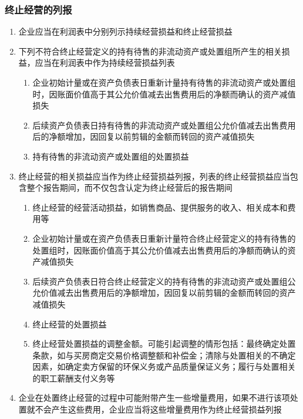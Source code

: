 \documentclass[UTF8,12pt]{ctexart}
\numberwithin{equation}{section} %
\numberwithin{figure}{section}
\numberwithin{table}{section}
\begin{document}
	\subsubsection{终止经营的列报}
	\begin{enumerate}
		\item 企业应当在利润表中分别列示持续经营损益和终止经营损益
		
		\item 下列不符合终止经营定义的持有待售的非流动资产或处置组所产生的相关损益，应当在利润表中作为持续经营损益列表
		\begin{enumerate}
			\item 企业初始计量或在资产负债表日重新计量持有待售的非流动资产或处置组时，因账面价值高于其公允价值减去出售费用后的净额而确认的资产减值损失
			
			\item 后续资产负债表日持有待售的非流动资产或处置组公允价值减去出售费用后的净额增加，因回复以前剪辑的金额而转回的资产减值损失
			
			\item 持有待售的非流动资产或处置组的处置损益
		\end{enumerate}
		
		\item 终止经营的相关损益应当作为终止经营损益列报，列表的终止经营损益应当包含整个报告期间，而不仅包含认定为终止经营后的报告期间
		\begin{enumerate}
			\item 终止经营的经营活动损益，如销售商品、提供服务的收入、相关成本和费用等
			
			\item 企业初始计量或在资产负债表日重新计量符合终止经营定义的持有待售的处置组时，因账面价值高于其公允价值减去出售费用后的净额而确认的资产减值损失
			
			\item 后续资产负债表日符合终止经营定义的持有待售的非流动资产或处置组公允价值减去出售费用后的净额增加，因回复以前剪辑的金额而转回的资产减值损失
			
			\item 终止经营的处置损益
			
			\item 终止经营处置损益的调整金额。可能引起调整的情形包括：最终确定处置条款，如与买房商定交易价格调整额和补偿金；清除与处置相关的不确定因素，如确定卖方保留的环保义务或产品质量保证义务；履行与处置相关的职工薪酬支付义务等
		\end{enumerate}
	
		\item 企业在处置终止经营的过程中可能附带产生一些增量费用，如果不进行该项处置就不会产生这些费用，企业应当将这些增量费用作为终止经营损益列报
		

\end{enumerate}
\end{document}

